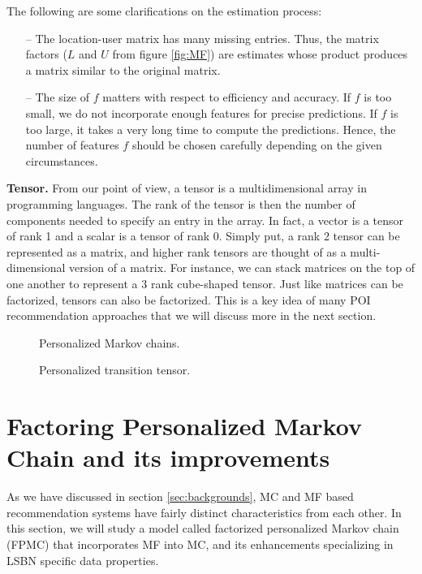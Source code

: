 \documentclass{sig-alternate}
\begin{document}
The following are some clarifications on the estimation process:
\begin{itemize}
\item[--] The location-user matrix has many missing entries. Thus, the matrix factors ($L$ and $U$ from figure \ref{fig:MF}) are 
estimates whose product produces a matrix similar to the original matrix.
\item[--] The size of $f$ matters with respect to efficiency and accuracy. If $f$ is too small, we do not 
incorporate enough features for precise predictions. If $f$ is too large, it takes a very long time 
to compute the predictions. Hence, the number of features $f$ should be chosen carefully depending on 
the given circumstances.
\end{itemize}

\textbf{Tensor.} From our point of view, a tensor is a multidimensional array  in programming languages.  
The rank of the tensor is then the number of components needed to specify an entry in the array. 
In fact, a vector is a tensor of rank 1 and a scalar is a tensor 
of rank 0. Simply put, a rank 2 tensor can be represented as a matrix, and higher rank tensors 
are thought of as a multi-dimensional version of a matrix. For instance, we can stack matrices on 
the top of one another to represent a 3 rank cube-shaped tensor.
Just like matrices can be factorized, tensors can also be factorized. 
This is a key idea of many POI recommendation approaches 
that we will discuss more in the next section.

\begin{figure}
\centering
{}
\caption{Personalized Markov chains.}
\label{fig:FPMC_naive}
\end{figure}

\begin{figure}
\centering
{}
\caption{Personalized transition tensor.}
\label{fig:FPMC}
\end{figure}

\section{Factoring Personalized Markov Chain and its improvements}
\label{sec:fpmc}

As we have discussed in section \ref{sec:backgrounds}, MC and MF based recommendation systems
have fairly distinct characteristics from each other. In this section, we will study a model called 
factorized personalized Markov chain (FPMC) that incorporates MF into MC, and its 
enhancements specializing in LSBN specific data properties.
\end{document}
